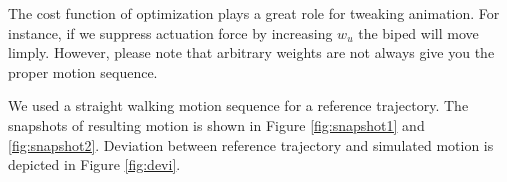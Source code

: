 \documentclass[master,english,final]{kaist-ucs}
\begin{document}
The cost function of optimization plays a great role for tweaking
animation. For instance, if we suppress actuation force by increasing $w_u$
the biped will move limply. However, please note that arbitrary
weights are not always give you the proper motion sequence.

We used a straight walking motion sequence
for a reference trajectory. The snapshots of resulting motion is
shown in Figure \ref{fig:snapshot1} and \ref{fig:snapshot2}.
Deviation between reference trajectory and simulated motion is
depicted in Figure \ref{fig:devi}.



\end{document}
